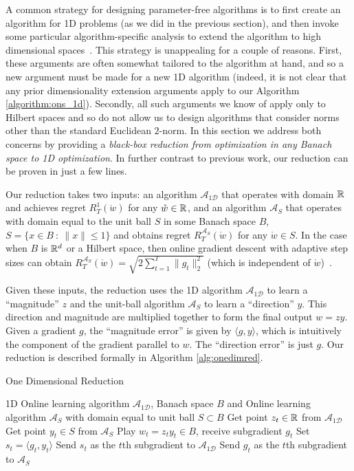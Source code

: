 \documentclass[12pt]{colt2018} %
\newcommand{\bol}{\mathcal{A}_{S}}
\newcommand{\onedol}{\mathcal{A_{\text{1D}}}}
\newcommand{\w}{\mathring{w}}
\begin{document}
A common strategy for designing parameter-free algorithms is to first create an algorithm for 1D problems (as we did in the previous section), and then invoke some particular algorithm-specific analysis to extend the algorithm to high dimensional spaces~\citep{orabona2016coin, cutkosky2016online, mcmahan2014unconstrained}. This strategy is unappealing for a couple of reasons. First, these arguments are often somewhat tailored to the algorithm at hand, and so a new argument must be made for a new 1D algorithm (indeed, it is not clear that any prior dimensionality extension arguments apply to our Algorithm \ref{algorithm:ons_1d}). Secondly, all such arguments we know of apply only to Hilbert spaces and so do not allow us to design algorithms that consider norms other than the standard Euclidean $2$-norm. In this section we address both concerns by providing a \emph{black-box reduction from optimization in any Banach space to 1D optimization}. In further contrast to previous work, our reduction can be proven in just a few lines.

Our reduction takes two inputs: an algorithm $\onedol$ that operates with domain $\mathbb{R}$ and achieves regret $R^1_T(\w)$ for any $\w\in \R$, and an algorithm $\bol$ that operates with domain equal to the unit ball $S$ in some Banach space $B$, $S=\{x\in B\ :\ \|x\|\le 1\}$ and obtains regret $R^{\bol}_T(\w)$ for any $\w\in S$. In the case when $B$ is $\mathbb{R}^d$ or a Hilbert space, then online gradient descent with adaptive step sizes can obtain $R^{\bol}_T(\w)=\sqrt{2\sum_{t=1}^T \|g_t\|^2_2}$ (which is independent of $\w$)~\citep{hazan2008adaptive}.

Given these inputs, the reduction uses the 1D algorithm $\onedol$ to learn a ``magnitude'' $z$ and the unit-ball algorithm $\bol$ to learn a ``direction'' $y$. This direction and magnitude are multiplied together to form the final output $w=zy$. Given a gradient $g$, the ``magnitude error'' is given by $\langle g, y\rangle$, which is intuitively the component of the gradient parallel to $w$. The ``direction error'' is just $g$. Our reduction is described formally in Algorithm \ref{alg:onedimred}.

\begin{algorithm}[h]
   \caption{One Dimensional Reduction}
   \label{alg:onedimred}
\begin{algorithmic}[1]
   \REQUIRE 1D Online learning algorithm $\onedol$, Banach space $B$ and Online learning algorithm $\bol$ with domain equal to unit ball $S\subset B$
   \STATE Get point $z_t\in \mathbb{R}$ from $\onedol$
   \STATE Get point $y_t\in S$ from $\bol$
   \STATE Play $w_t = z_ty_t\in B$, receive subgradient $g_t$
   \STATE Set $s_t = \langle g_t, y_t\rangle$
   \STATE Send $s_t$ as the $t$th subgradient to $\onedol$
   \STATE Send $g_t$ as the $t$th subgradient to $\bol$
   \ENDFOR
\end{algorithmic}
\end{algorithm}
\end{document}
